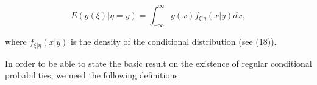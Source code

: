 $$E(g(\xi) | \eta = y) = \int_{-\infty}^{\infty} g(x) f_{\xi| \eta}(x | y) dx,$$

where $f_{\xi| \eta}(x | y)$ is the density of the conditional distribution (see (18)).

In order to be able to state the basic result on the existence of regular conditional probabilities, we need the following definitions.
